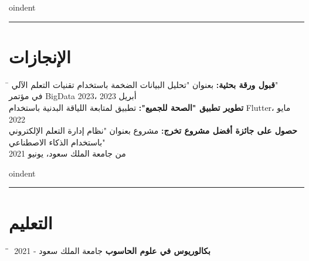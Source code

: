 \documentclass[a4paper,10pt]{article} %
\begin{document}
\begin{RTL}
\vspace{0.3cm}

oindent\rule{\textwidth}{1pt} %
\vspace{0.3cm}

\section*{الإنجازات}
\vspace{0.5cm} %
\begin{tabbing}
    \hspace{12cm} \= \kill
    \textbf{قبول ورقة بحثية:} بعنوان "تحليل البيانات الضخمة باستخدام تقنيات التعلم الآلي"\\ في مؤتمر BigData 2023، أبريل 2023 \\
    \textbf{تطوير تطبيق "الصحة للجميع":} تطبيق لمتابعة اللياقة البدنية باستخدام Flutter، مايو 2022 \\
    \textbf{حصول على جائزة أفضل مشروع تخرج:} مشروع بعنوان "نظام إدارة التعلم الإلكتروني باستخدام الذكاء الاصطناعي"\\ من جامعة الملك سعود، يونيو 2021 \\
\end{tabbing}

\vspace{0.3cm}

oindent\rule{\textwidth}{1pt} %
\vspace{0.3cm}

\section*{التعليم}
\vspace{0.5cm} %
\begin{tabbing}
    \hspace{8cm} \= \hspace{5cm} \= \kill
    \textbf{بكالوريوس في علوم الحاسوب} \> جامعة الملك سعود  - 2021 \\
\end{tabbing}

\end{RTL}
\end{document}
